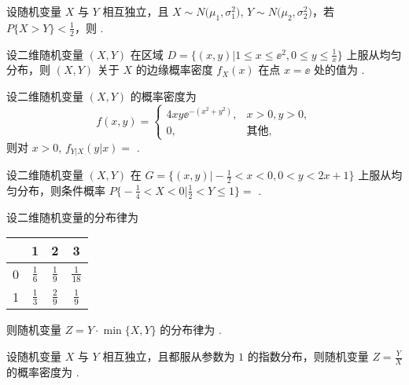 	\begin{titwo}
		设随机变量 $X$ 与 $Y$ 相互独立，且 $X \sim N \bigl( \mu_{1},\sigma_{1}^{2} \bigr)$, $Y \sim N\bigl( \mu_{2},\sigma_{2}^{2} \bigr)$，若 $P\{ X > Y \} < \frac{1}{2}$，则 \kuo.

	\end{titwo}

	\begin{titwo}
		设二维随机变量 $(X,Y)$ 在区域 $D = \bigl\{ (x,y) \bigl| 1 \leq x \leq \ee^{2}, 0 \leq y \leq \frac{1}{x} \bigr\}$ 上服从均匀分布，则 $(X,Y)$ 关于 $X$ 的边缘概率密度 $f_{X}(x)$ 在点 $x = \ee$ 处的值为 \htwo.
	\end{titwo}

	\begin{titwo}
		设二维随机变量 $(X,Y)$ 的概率密度为 \[f(x,y) = \begin{cases}
			4xy \ee^{-( x^{2} + y^{2} )}, & x > 0, y > 0, \\
			0, & \text{其他},
		\end{cases}\] 则对 $x > 0$, $f_{Y|X} (y|x) = $ \htwo.
	\end{titwo}

	\begin{titwo}
		设二维随机变量 $(X,Y)$ 在 $G = \bigl\{ (x,y) \bigl| - \frac{1}{2} < x < 0, 0 < y < 2x + 1 \bigr\}$ 上服从均匀分布，则条件概率 $P \bigl\{ - \frac{1}{4} < X < 0 \bigl| \frac{1}{2} < Y \leq 1 \bigr\} = $ \htwo.
	\end{titwo}

	\begin{titwo}
		设二维随机变量的分布律为
		\begin{center}
			\begin{tabular}{c|ccc}
				\hline
				\diagbox{$X$}{$Y$} & 1 & 2 & 3 \\
				\hline
				0 & $\frac{1}{6}$ & $\frac{1}{9}$ & $\frac{1}{18}$ \\
				1 & $\frac{1}{3}$ & $\frac{2}{9}$ & $\frac{1}{9}$ \\
				\hline
			\end{tabular}
		\end{center}
		则随机变量 $Z = Y \cdot \min\{ X,Y \}$ 的分布律为 \htwo.
	\end{titwo}

	\begin{titwo}
		设随机变量 $X$ 与 $Y$ 相互独立，且都服从参数为 $1$ 的指数分布，则随机变量 $Z = \frac{Y}{X}$ 的概率密度为 \htwo.
	\end{titwo}

